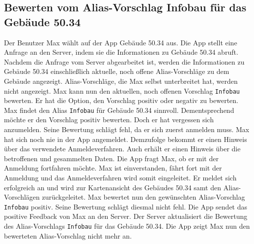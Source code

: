 \subsection{Bewerten vom Alias-Vorschlag Infobau für das Gebäude 50.34}

Der Benutzer Max wählt auf der App Gebäude 50.34 aus.
Die App stellt eine Anfrage an den Server, indem sie die Informationen zu Gebäude 50.34 abruft. 
Nachdem die Anfrage vom Server abgearbeitet ist, werden die Informationen zu Gebäude 50.34 einschließlich aktuelle, noch offene Alias-Vorschläge zu dem Gebäude angezeigt.
Alias-Vorschläge, die Max selbst unterbreitet hat, werden nicht angezeigt.
Max kann nun den aktuellen, noch offenen Vorschlag \texttt{Infobau} bewerten.
Er hat die Option, den Vorschlag positiv oder negativ zu bewerten.
Max findet den Alias \texttt{Infobau} für Gebäude 50.34 sinnvoll.
Dementsprechend möchte er den Vorschlag positiv bewerten.
Doch er hat vergessen sich anzumelden.
Seine Bewertung schlägt fehl, da er sich zuerst anmelden muss.
Max hat sich noch nie in der App angemeldet.
Demzufolge bekommt er einen Hinweis über das verwendete Anmeldeverfahren.
Auch erhält er einen Hinweis über die betroffenen und gesammelten Daten.
Die App fragt Max, ob er mit der Anmeldung fortfahren möchte.
Max ist einverstanden, fährt fort mit der Anmeldung und das Anmeldeverfahren wird somit eingeleitet.
Er meldet sich erfolgreich an und wird zur Kartenansicht des Gebäudes 50.34 samt den Alias-Vorschlägen zurückgeleitet.
Max bewertet nun den gewünschten Alias-Vorschlag \texttt{Infobau} positiv.
Seine Bewertung schlägt diesmal nicht fehl.
Die App sendet das positive Feedback von Max an den Server.
Der Server aktualisiert die Bewertung des Alias-Vorschlags \texttt{Infobau} für das Gebäude 50.34.
Die App zeigt Max nun den bewerteten Alias-Vorschlag nicht mehr an.